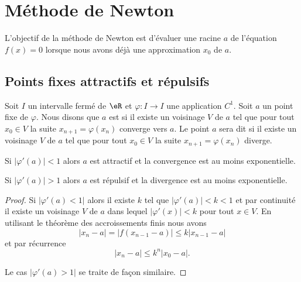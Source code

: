 \section{Méthode de Newton}

L'objectif de la méthode de Newton est d'évaluer une racine \( a\) de l'équation \( f(x)=0\) lorsque nous avons déjà une approximation \( x_0\) de \( a\).

\subsection{Points fixes attractifs et répulsifs}

Soit \( I\) un intervalle fermé de \( \eR\) et \( \varphi\colon I\to I\) une application \( C^1\). Soit \( a\) un point fixe de \( \varphi\). Nous disons que \( a\) est  si il existe un voisinage \( V\) de \( a\) tel que pour tout \( x_0\in V\) la suite \( x_{n+1}=\varphi(x_n)\) converge vers \( a\). Le point \( a\) sera dit  si il existe un voisinage \( V\) de \( a\) tel que pour tout \( x_0\in V\) la suite \( x_{n+1}=\varphi(x_n)\) diverge.

\begin{lemma}
    Si \( | \varphi'(a) |<1\) alors \( a\) est attractif et la convergence est au moins exponentielle.

    Si \( | \varphi'(a) |>1\) alors \( a\) est répulsif et la divergence est au moins exponentielle.
\end{lemma}

\begin{proof}
    Si \( | \varphi'(a)<1 |\) alors il existe \( k\) tel que \( | \varphi'(a) |<k<1\) et par continuité il existe un voisinage \( V\) de \( a\) dans lequel \( | \varphi'(x) |<k\) pour tout \( x\in V\). En utilisant le théorème des accroissements finis nous avons
    \begin{equation}
        | x_n-a |=\big| f(x_{n-1}-a) \big|\leq k| x_{n-1}-a |
    \end{equation}
    et par récurrence
    \begin{equation}
        | x_n-a |\leq k^n| x_0-a |.
    \end{equation}

    Le cas \( | \varphi'(a)>1 |\) se traite de façon similaire.
\end{proof}

